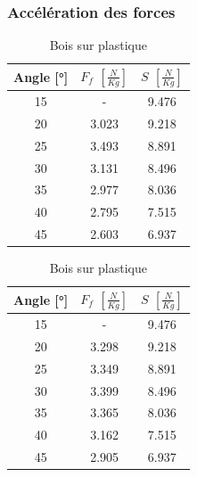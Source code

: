 \documentclass[twoside,twocolumn]{article}
\begin{document}
\subsubsection*{Accélération des forces}
\begin{table}[H]
\centering
\caption{Bois sur bois}
\begin{tabular}{|c|c|c|}
\hline
Angle [°] & $F_f$ $\left[ \frac{N}{Kg} \right]$ &$S$ $\left[ \frac{N}{Kg} \right]$ \\
           \hline \hline
15        &- & 9.476 \\
           \hline
20        &3.023 & 9.218 \\
           \hline
25        &3.493 & 8.891 \\
           \hline
30        &3.131 & 8.496 \\
           \hline
35        &2.977 & 8.036 \\
           \hline
40        &2.795 & 7.515 \\
           \hline
45        &2.603 & 6.937 \\
           \hline
\end{tabular}
\label{table:v-abb}

\caption{Bois sur plastique}
\begin{tabular}{|c|c|c|}
\hline
Angle [°] & $F_{f}$ $\left[ \frac{N}{Kg} \right]$ &$S$ $\left[ \frac{N}{Kg} \right]$ \\
           \hline \hline
15        &- & 9.476 \\
           \hline
20        &3.298 & 9.218 \\
           \hline
25        &3.349 & 8.891 \\
           \hline
30        &3.399 & 8.496 \\
           \hline
35        &3.365 & 8.036 \\
           \hline
40        &3.162 & 7.515 \\
           \hline
45        &2.905 & 6.937 \\
           \hline
\end{tabular}
\label{table:v-abp}

\end{table}
\end{document}
